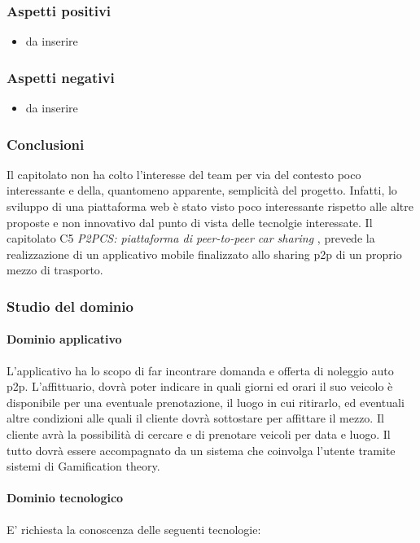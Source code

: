 		\subsubsection{Aspetti positivi}
		\begin{itemize}
			\item da inserire
		\end{itemize}
		\subsubsection{Aspetti negativi}
		\begin{itemize}
			\item da inserire
		\end{itemize}
		\subsubsection{Conclusioni}
		Il capitolato non ha colto l'interesse del team per via del contesto poco interessante e della, quantomeno apparente, semplicità del progetto. Infatti, lo sviluppo di una piattaforma web è stato visto poco interessante rispetto alle altre proposte e non innovativo dal punto di vista delle tecnolgie interessate. 
		Il capitolato C5 \emph{P2PCS:  piattaforma di peer-to-peer car sharing} , prevede la realizzazione di un
applicativo mobile finalizzato allo sharing p2p di un proprio mezzo di trasporto.

		\subsubsection{Studio del dominio}
			\paragraph{Dominio applicativo} \Spazio
			L'applicativo ha lo scopo di far incontrare domanda e offerta di noleggio auto p2p.
L'affittuario, dovrà poter indicare in quali giorni ed orari il suo veicolo è disponibile
per una eventuale prenotazione, il luogo in cui ritirarlo, ed eventuali altre
condizioni alle quali il cliente dovrà sottostare per affittare il mezzo.
Il cliente avrà la possibilità di cercare e di prenotare veicoli per data e luogo.
Il tutto dovrà essere accompagnato da un sistema che coinvolga l'utente tramite sistemi di
Gamification theory.
			\paragraph{Dominio tecnologico} \Spazio
			E' richiesta la conoscenza delle seguenti tecnologie:
